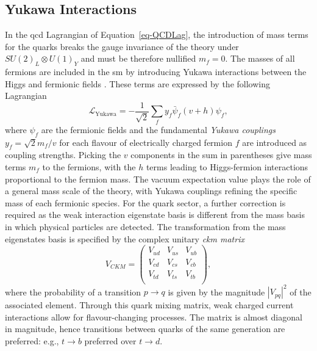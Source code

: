 \subsection{Yukawa Interactions}\label{subset-yukint}
In the \gls{qcd} Lagrangian of Equation~\ref{eq-QCDLag}, the introduction of mass terms for the quarks breaks the gauge invariance of the theory under $SU(2)_L \otimes U(1)_Y$ and must be therefore nullified $m_f = 0$. The masses of all fermions are included in the \gls{sm} by introducing Yukawa interactions between the Higgs and fermionic fields \cite{10.1143/PTPS.1.1}. These terms are expressed by the following Lagrangian
\begin{equation}\label{eq-YukLag}
    \mathcal{L}_{\text{Yukawa}} = - \frac{1}{\sqrt{2}} \sum_{f} 
    y_f \bar{\psi}_f (v + h) \psi_f,
\end{equation}
where $\psi_f$ are the fermionic fields and the fundamental \textit{Yukawa couplings} $y_f = \sqrt{2}m_f/v$ for each flavour of electrically charged fermion $f$ are introduced as coupling strengths. Picking the $v$ components in the sum in parentheses give mass terms $m_f$ to the fermions, with the $h$ terms leading to Higgs-fermion interactions proportional to the fermion mass. The vacuum expectation value plays the role of a general mass scale of the theory, with Yukawa couplings refining the specific mass of each fermionic species. For the quark sector, a further correction is required as the weak interaction eigenstate basis is different from the mass basis in which physical particles are detected. The transformation from the mass eigenstates basis is specified by the complex unitary \textit{\gls{ckm} matrix} \cite{Tanabashi:2018oca}
\begin{equation}
    V_{CKM} = \begin{pmatrix}
            V_{ud} & V_{us} & V_{ub}\\ 
            V_{cd} & V_{cs} & V_{cb}\\ 
            V_{td} & V_{ts} & V_{tb}\\ 
        \end{pmatrix},
\end{equation}
where the probability of a transition $p \rightarrow q$ is given by the magnitude $|V_{pq}|^2$ of the associated element. Through this quark mixing matrix, weak charged current interactions allow for flavour-changing processes. The matrix is almost diagonal in magnitude, hence transitions between quarks of the same generation are preferred: e.g., $t \rightarrow b$ preferred over $t \rightarrow d$.

